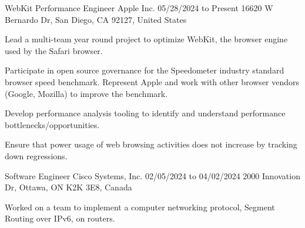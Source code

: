 

\begin{cventries}

  \cventry
    {WebKit Performance Engineer} %
    {Apple Inc.} %
    {05/28/2024 to Present} %
    {16620 W Bernardo Dr, San Diego, CA 92127, United States} %
    {
      \begin{cvitems} %
        \item{Lead a multi-team year round project to optimize WebKit, the browser engine used by the Safari browser.} %
        \item{Participate in open source governance for the Speedometer industry standard browser speed benchmark. Represent Apple and work with other browser vendors (Google, Mozilla) to improve the benchmark.}
        \item{Develop performance analysis tooling to identify and understand performance bottlenecks/opportunities.}
        \item{Ensure that power usage of web browsing activities does not increase by tracking down regressions.}
      \end{cvitems}
    }
  \cventry
    {Software Engineer} %
    {Cisco Systems, Inc.} %
    {02/05/2024 to 04/02/2024} %
    {2000 Innovation Dr, Ottawa, ON K2K 3E8, Canada} %
    {
      \begin{cvitems} %
        \item{Worked on a team to implement a computer networking protocol, Segment Routing over IPv6, on routers.}

\end{cvitems}}
\end{cventries}
